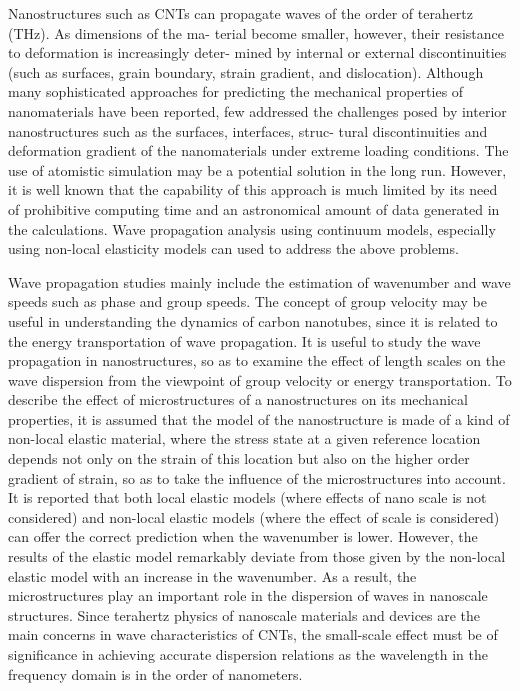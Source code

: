 Nanostructures such as CNTs can propagate waves of the order of terahertz (THz). As dimensions of the ma-
terial become smaller, however, their resistance to deformation is increasingly deter-
mined by internal or external discontinuities (such as surfaces, grain boundary, strain
gradient, and dislocation). Although many sophisticated approaches for predicting
the mechanical properties of nanomaterials have been reported, few addressed the
challenges posed by interior nanostructures such as the surfaces, interfaces, struc-
tural discontinuities and deformation gradient of the nanomaterials under extreme
loading conditions. The use of atomistic simulation may be a potential solution in
the long run. However, it is well known that the capability of this approach is much
limited by its need of prohibitive computing time and an astronomical amount of data
generated in the calculations. Wave propagation analysis using continuum models,
especially using non-local elasticity models can used to address the above problems.

Wave propagation studies mainly include the estimation of wavenumber and wave
speeds such as phase and group speeds. The concept of group velocity may be useful
in understanding the dynamics of carbon nanotubes, since it is related to the energy
transportation of wave propagation. It is useful to study the
wave propagation in nanostructures, so as to examine the effect of length scales on
the wave dispersion from the viewpoint of group velocity or energy transportation. To
describe the effect of microstructures of a nanostructures on its mechanical properties,
it is assumed that the model of the nanostructure is made of a kind of non-local elastic
material, where the stress state at a given reference location depends not only on the
strain of this location but also on the higher order gradient of strain, so as to take
the influence of the microstructures into account. It is reported that both local elastic
models (where effects of nano scale is not considered) and non-local elastic models
(where the effect of scale is considered) can offer the correct prediction when the
wavenumber is lower. However, the results of the elastic model remarkably deviate
from those given by the non-local elastic model with an increase in the wavenumber.
As a result, the microstructures play an important role in the dispersion of waves in
nanoscale structures. Since terahertz physics of nanoscale materials and devices are
the main concerns in wave characteristics of CNTs, the small-scale effect must be
of significance in achieving accurate dispersion relations as the wavelength in the
frequency domain is in the order of nanometers.

